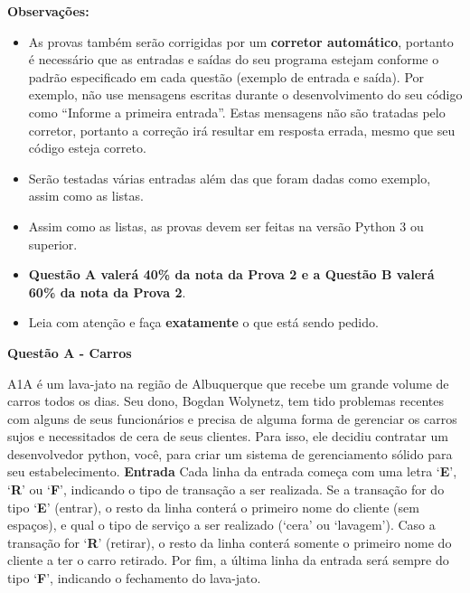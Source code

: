 \documentclass[a4paper, 12pt]{article}
\begin{document}
\textbf{{\large Observações:}}
\begin{itemize}
	\item As provas também serão corrigidas por um \textbf{corretor automático}, portanto é necessário que as entradas e saídas do seu programa estejam conforme o padrão especificado em cada questão (exemplo de entrada e saída). Por exemplo, não use mensagens escritas durante o desenvolvimento do seu código como “Informe a primeira entrada”. Estas mensagens não são tratadas pelo corretor, portanto a correção irá resultar em resposta errada, mesmo que seu código esteja correto.
	\item Serão testadas várias entradas além das que foram dadas como exemplo, assim como as listas.
	\item Assim como as listas, as provas devem ser feitas na versão Python 3 ou superior.
	\item \textbf{Questão A valerá 40\% da nota da Prova 2 e a Questão B valerá 60\% da nota da Prova 2}.
	\item Leia com atenção e faça \textbf{exatamente} o que está sendo pedido.
\end{itemize}
\newpage %
\begin{center}
\textbf{{\Large Questão A - Carros}}
\end{center}
\vspace{5pt}
A1A é um lava-jato na região de Albuquerque que recebe um grande volume de
carros todos os dias. Seu dono, Bogdan Wolynetz, tem tido problemas recentes
com alguns de seus funcionários e precisa de alguma forma de gerenciar os carros
sujos e necessitados de cera de seus clientes. Para isso, ele decidiu contratar um desenvolvedor python, você, para criar um sistema de gerenciamento sólido para seu estabelecimento. \newline \newline
\textbf{{\large Entrada}} \newline
Cada linha da entrada começa com uma letra `\textbf{E}', `\textbf{R}' ou `\textbf{F}', indicando o tipo de
transação a ser realizada.
Se a transação for do tipo `\textbf{E}' (entrar), o resto da linha conterá o primeiro nome do
cliente (sem espaços), e qual o tipo de serviço a ser realizado (`cera' ou `lavagem').
Caso a transação for `\textbf{R}' (retirar), o resto da linha conterá somente o primeiro nome
do cliente a ter o carro retirado.
Por fim, a última linha da entrada será sempre do tipo `\textbf{F}', indicando o fechamento
do lava-jato. \newline \newline
\end{document}
